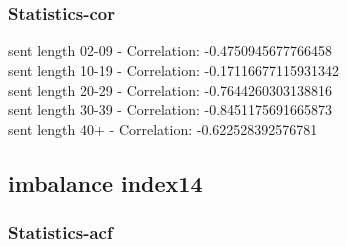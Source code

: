 \documentclass{article}%
\begin{document}
\begin{figure}[ht]%
\centering%
\setlength{\abovecaptionskip}{-35pt}%
%
%
\\%
%
%
\\%
%
\end{figure}

%
\newpage%
\subsubsection{Statistics{-}cor}%
\label{ssubsec:Statistics{-}cor}%
\noindent%
sent length 02-09 - Correlation: -0.4750945677766458\\%
sent length 10-19 - Correlation: -0.17116677115931342\\%
sent length 20-29 - Correlation: -0.7644260303138816\\%
sent length 30-39 - Correlation: -0.8451175691665873\\%
sent length 40+ - Correlation: -0.622528392576781\\

%
\newpage

%
\subsection{imbalance index14}%
\label{subsec:imbalanceindex14}%
\subsubsection{Statistics{-}acf}%
\label{ssubsec:Statistics{-}acf}%
\end{document}
